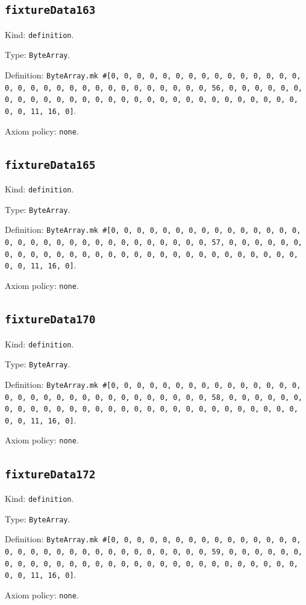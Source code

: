 \documentclass[11pt]{article}
\begin{document}
\subsection*{\texttt{fixtureData163}}
\noindent Kind: \texttt{definition}.\par
\noindent Type: \texttt{ByteArray}.\par
\noindent Definition: \texttt{ByteArray.mk \#[0, 0, 0, 0, 0, 0, 0, 0, 0, 0, 0, 0, 0, 0, 0, 0, 0, 0, 0, 0, 0, 0, 0, 0, 0, 0, 0, 0, 0, 0, 0, 56, 0, 0, 0, 0, 0, 0, 0, 0, 0, 0, 0, 0, 0, 0, 0, 0, 0, 0, 0, 0, 0, 0, 0, 0, 0, 0, 0, 0, 0, 0, 0, 11, 16, 0]}.\par
\noindent Axiom policy: \texttt{none}.\par
\subsection*{\texttt{fixtureData165}}
\noindent Kind: \texttt{definition}.\par
\noindent Type: \texttt{ByteArray}.\par
\noindent Definition: \texttt{ByteArray.mk \#[0, 0, 0, 0, 0, 0, 0, 0, 0, 0, 0, 0, 0, 0, 0, 0, 0, 0, 0, 0, 0, 0, 0, 0, 0, 0, 0, 0, 0, 0, 0, 57, 0, 0, 0, 0, 0, 0, 0, 0, 0, 0, 0, 0, 0, 0, 0, 0, 0, 0, 0, 0, 0, 0, 0, 0, 0, 0, 0, 0, 0, 0, 0, 11, 16, 0]}.\par
\noindent Axiom policy: \texttt{none}.\par
\subsection*{\texttt{fixtureData170}}
\noindent Kind: \texttt{definition}.\par
\noindent Type: \texttt{ByteArray}.\par
\noindent Definition: \texttt{ByteArray.mk \#[0, 0, 0, 0, 0, 0, 0, 0, 0, 0, 0, 0, 0, 0, 0, 0, 0, 0, 0, 0, 0, 0, 0, 0, 0, 0, 0, 0, 0, 0, 0, 58, 0, 0, 0, 0, 0, 0, 0, 0, 0, 0, 0, 0, 0, 0, 0, 0, 0, 0, 0, 0, 0, 0, 0, 0, 0, 0, 0, 0, 0, 0, 0, 11, 16, 0]}.\par
\noindent Axiom policy: \texttt{none}.\par
\subsection*{\texttt{fixtureData172}}
\noindent Kind: \texttt{definition}.\par
\noindent Type: \texttt{ByteArray}.\par
\noindent Definition: \texttt{ByteArray.mk \#[0, 0, 0, 0, 0, 0, 0, 0, 0, 0, 0, 0, 0, 0, 0, 0, 0, 0, 0, 0, 0, 0, 0, 0, 0, 0, 0, 0, 0, 0, 0, 59, 0, 0, 0, 0, 0, 0, 0, 0, 0, 0, 0, 0, 0, 0, 0, 0, 0, 0, 0, 0, 0, 0, 0, 0, 0, 0, 0, 0, 0, 0, 0, 11, 16, 0]}.\par
\noindent Axiom policy: \texttt{none}.\par
\end{document}
